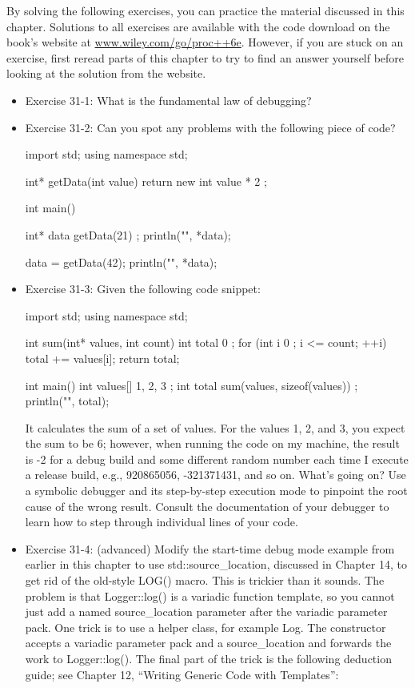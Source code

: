By solving the following exercises, you can practice the material discussed in this chapter. Solutions to all exercises are available with the code download on the book’s website at \url{www.wiley.com/go/proc++6e}. However, if you are stuck on an exercise, first reread parts of this chapter to try to find an answer yourself before looking at the solution from the website.

\begin{itemize}
\item
Exercise 31-1: What is the fundamental law of debugging?

\item
Exercise 31-2: Can you spot any problems with the following piece of code?

\begin{cpp}
import std;
using namespace std;

int* getData(int value) { return new int { value * 2 }; }

int main()
{
    int* data { getData(21) };
    println("{}", *data);

    data = getData(42);
    println("{}", *data);
}
\end{cpp}

\item
Exercise 31-3: Given the following code snippet:

\begin{cpp}
import std;
using namespace std;

int sum(int* values, int count)
{
    int total { 0 };
    for (int i { 0 }; i <= count; ++i) { total += values[i]; }
    return total;
}

int main()
{
    int values[] { 1, 2, 3 };
    int total { sum(values, sizeof(values)) };
    println("{}", total);
}
\end{cpp}

It calculates the sum of a set of values. For the values 1, 2, and 3, you expect the sum to be 6; however, when running the code on my machine, the result is -2 for a debug build and some different random number each time I execute a release build, e.g., 920865056, -321371431, and so on. What’s going on? Use a symbolic debugger and its step-by-step execution mode to pinpoint the root cause of the wrong result. Consult the documentation of your debugger to learn how to step through individual lines of your code.

\item
Exercise 31-4: (advanced) Modify the start-time debug mode example from earlier in this chapter to use std::source\_location, discussed in Chapter 14, to get rid of the old-style LOG() macro. This is trickier than it sounds. The problem is that Logger::log() is a variadic function template, so you cannot just add a named source\_location parameter after the variadic parameter pack. One trick is to use a helper class, for example Log. The constructor accepts a variadic parameter pack and a source\_location and forwards the work to Logger::log(). The final part of the trick is the following deduction guide; see Chapter 12, “Writing Generic Code with Templates”:


\end{itemize}
